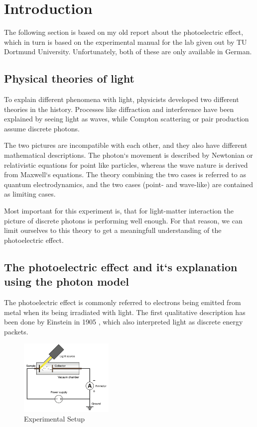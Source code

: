 \section{Introduction}
\label{sec:introduction}
The following section is based on my old report about the photoelectric effect, which in turn is
based on the experimental manual for the lab given out by TU Dortmund University. Unfortunately,
both of these are only available in German.

\subsection{Physical theories of light}
\label{sec:intr:theory}
To explain different phenomena with light, physicists developed two different theories in the
history. Processes like diffraction and interference have been explained by seeing light as waves,
while Compton scattering or pair production assume discrete photons. 

The two pictures are incompatible with each other, and they also have different mathematical
descriptions. The photon`s movement is described by Newtonian or relativistic equations for
point like particles, whereas the wave nature is derived from Maxwell`s equations. The theory
combining the two cases is referred to as quantum electrodynamics, and the two cases (point- and 
wave-like) are contained as limiting cases.

Most important for this experiment is, that for light-matter interaction the picture of discrete
photons is performing well enough. For that reason, we can limit ourselves to this theory to get a
meaningfull understanding of the photoelectric effect.

\subsection{The photoelectric effect and it`s explanation using the photon model}
\label{sec:intr:photoeffect}
The photoelectric effect is commonly referred to electrons being emitted from metal when its being
irradiated with light. The first qualitative description has been done by Einstein in 1905
\cite{https://doi.org/10.1002/andp.19053220607}, which also interpreted light as discrete energy
packets.

\begin{figure}
    \centering
    \includegraphics[width=0.4\textwidth]{media/ExperimentalSetup.png}
    \caption{Experimental Setup}
    \label{fig:ExpSetup}
\end{figure}

